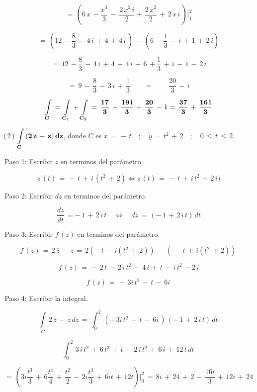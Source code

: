 \documentclass[a4paper,11pt,openany]{book}
\begin{document}
$$=\,\left(6\,x\,-\dfrac{x^{3}}{3}\,-\,\dfrac{2\,x^{2}\,i}{2}+\,\dfrac{2\,x^{2}}{2}\,+\,2\,x\,i\,\right)\bigg|_{1}^{2}$$

$$=\,\left(12\,-\dfrac{8}{3}\,-\,4\,i\,+\,4\,+\,4\,i\,\right)\,-\,\left(6\,-\dfrac{1}{3}\,-\,i\,+\,1\,+\,2\,i\right)$$

$$=\,12\,-\dfrac{8}{3}\,-\,4\,i\,+\,4\,+\,4\,i\,-\,6\,+\dfrac{1}{3}\,+\,i\,-\,1\,-\,2\,i$$

$$=\,9\,-\,\dfrac{8}{3}\,-\,3\,i\,+\,\dfrac{1}{3} \qquad=\qquad\,\dfrac{20}{3}\,-\,i$$

$$\bf{\displaystyle\int\limits_{C}\,=\,\displaystyle\int\limits_{C_{1}}\,+\,\displaystyle\int\limits_{C_{2}}\,=\,\dfrac{17}{3}\,+\,\dfrac{19\,i}{3}\,+\,\dfrac{20}{3}\,-\,i\,=\,\dfrac{37}{3}\,+\,\dfrac{16\,i}{3}}$$



\textcolor{ao(english)}{(\,2\,)} $\bf{\displaystyle\int\limits_{C}\,(2\,\overline{z}\,-\,z)\,dz}$, \qquad donde \qquad $C$ es $x\,=\,-\,t \quad;\quad y\,=\,t^{2}\,+\,2 \quad;\quad 0\,\leq\,t\,\leq\,2$.


\textcolor{ao(english)}{\,Paso 1:} Escribir $z$ en terminos del parámetro.

$$z\,(t)\,=\,-\,t\,+\,i\,(t^{2}\,+\,2) \iff z\,(t)\,=\,-\,t\,+\,i\,t^{2}\,+\,2\,i)$$

\textcolor{ao(english)}{\,Paso 2:} Escribir $dz$ en terminos del parámetro.

$$\dfrac{dz}{dt}\,=-\,1\,+\,2\,i\,t \quad\iff\quad dz\,=\,(-\,1\,+\,2\,i\,t)\,dt$$

\textcolor{ao(english)}{\,Paso 3:} Escribir $f\,(z)$ en terminos del parámetro.

$$f\,(z)\,=\,2\,\overline{z}\,-\,z\,=\,2(-\,t\,-\,i(t^{2}\,+\,2))\,-\,(\,-\,t\,+\,i(t^{2}\,+\,2))\, $$

$$f\,(z)\,= \,-\,2\,t\,-\,2\,i\,t^{2}\,-\,4\,i\,+\,t\,-\,i\,t^{2}\,-2\,i  $$

$$f\,(z)\,= \,-\,3i\,t^{2}\,-\,t\,-\,6i\,  $$

\textcolor{ao(english)}{\,Paso 4:} Escribir la integral.

$$\displaystyle\int\limits_{C}\,2\,\overline{z}\,-\,z\,dz\,=\,\displaystyle\int_{0}^{2}\,(-\,3i\,t^{2}\,-\,t\,-\,6i\,)\,(-\,1\,+\,2\,i\,t)\,dt\,$$

$$\displaystyle\int_{0}^{2}\,3\,i\,t^{2}\,+\,6\,t^{3}\,+\,t\,-\,2\,i\,t^{2}\,+\,6\,i\,+\,12\,t\, dt\,$$

$$=\,\left(  3i\dfrac{t^{3}}{3}\,+\,6\dfrac{t^{4}}{4}\,+\,\dfrac{t^{2}}{2}\,-\,2i\dfrac{t^{3}}{3}\,+\,6it\,+\,12t\right)\bigg|_{0}^{2}\,=\,8i\,+\,24\,+\,2\,-\,\dfrac{16i}{3}\,+\,12i\,+\,24$$
\end{document}
